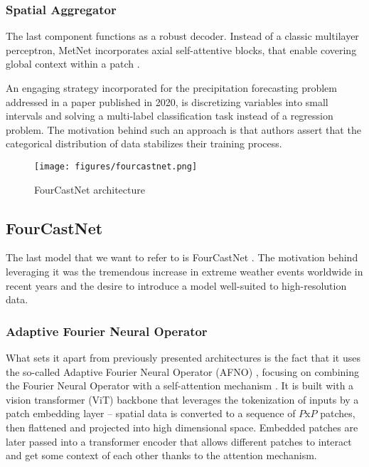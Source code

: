 \subsubsection{Spatial Aggregator}
The last component functions as a robust decoder. Instead of a classic multilayer perceptron, MetNet incorporates axial self-attentive blocks, that enable covering global context within a patch \cite{ho2019axial}.

 An engaging strategy incorporated for the precipitation forecasting problem addressed in a paper published in 2020, is discretizing variables into small intervals and solving a multi-label classification task instead of a regression problem. The motivation behind such an approach is that authors assert that the categorical distribution of data stabilizes their training process. 

\begin{figure}[!ht]
    \centering
    \texttt{[image: figures/fourcastnet.png]}
    \caption{FourCastNet architecture \cite{pathak2022fourcastnet}}
    \label{fig:fourcastnet}
\end{figure}

\subsection{FourCastNet} \label{sec:fourcastnet}
The last model that we want to refer to is FourCastNet \cite{pathak2022fourcastnet}. The motivation behind leveraging it was the tremendous increase in extreme weather events worldwide in recent years and the desire to introduce a model well-suited to high-resolution data.

\subsubsection{Adaptive Fourier Neural Operator}

What sets it apart from previously presented architectures is the fact that it uses the so-called Adaptive Fourier Neural Operator (AFNO) \cite{guibas2022adaptive}, focusing on combining the Fourier Neural Operator \cite{li2021fourier} with a self-attention mechanism \cite{vaswani2023attention}.
It is built with a vision transformer (ViT) backbone \cite{dosovitskiy2021image} that leverages the tokenization of inputs by a patch embedding layer -- spatial data is converted to a sequence of $P\text{x}P$ patches, then flattened and projected into high dimensional space.
Embedded patches are later passed into a transformer encoder that allows different patches to interact and get some context of each other thanks to the attention mechanism.

